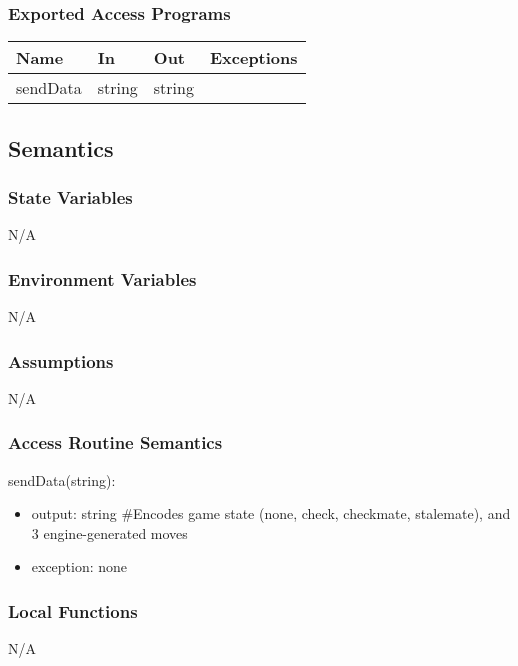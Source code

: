\documentclass[12pt, titlepage]{article}
\begin{document}
    \subsubsection{Exported Access Programs}
        \begin{center}
        \begin{tabular}{p{4.5cm} p{4cm} p{3cm} p{2.5cm}}
        \hline
        \textbf{Name} & \textbf{In} & \textbf{Out} & \textbf{Exceptions} \\
        \hline
        sendData & string & string & \\
        \hline
        \end{tabular}
        \end{center}

    \subsection{Semantics}
    \subsubsection{State Variables}
    N/A

    \subsubsection{Environment Variables}
    N/A

    \subsubsection{Assumptions}
    N/A

    \subsubsection{Access Routine Semantics}
        \noindent sendData(string):
        \begin{itemize}
            \item output: string \#Encodes game state (none, check, 
                checkmate, stalemate), and 3 engine-generated moves
            \item exception: none
        \end{itemize}

    \subsubsection{Local Functions}
    N/A

    \newpage
\end{document}
